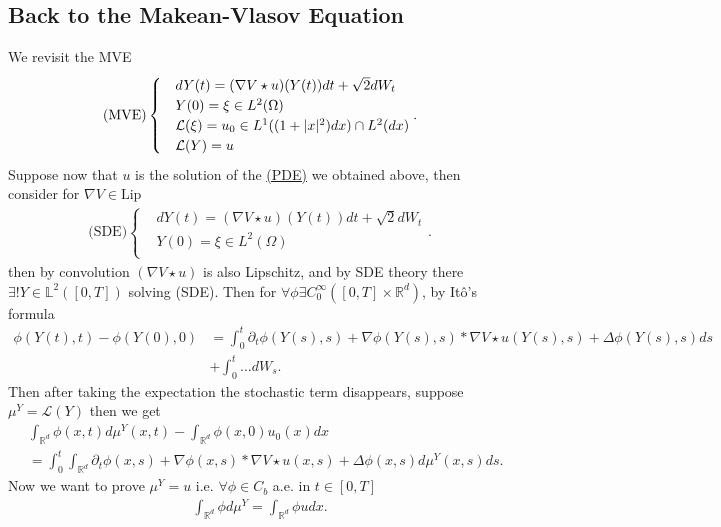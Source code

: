 \subsection{Back to the Makean-Vlasov Equation}
We revisit the MVE 
\begin{align*}
  \text{(MVE)}\begin{cases}
    &dY(t) = (\nabla V \star  u)(Y(t)) dt + \sqrt{2}dW_t \\
    &Y(0)  = \xi \in  L^{2}(\Omega )\\
    &\mathcal{L}(\xi) = u_0 \in  L^{1}((1+\lvert x\rvert^2)dx) \cap L^{2}(dx) \\
    &\mathcal{L}(Y) = u
  \end{cases}
.\end{align*}
Suppose now that $u$ is the solution of the  \hyperref[pde_mve_apprach]{(PDE)} we obtained above, then consider 
for $\nabla V \in  \text{Lip}$
\begin{align*} 
  \text{(SDE)}\begin{cases}
    &dY(t) = (\nabla V \star  u)(Y(t)) dt + \sqrt{2}dW_t \\
    &Y(0)  = \xi \in  L^{2}(\Omega )\\
  \end{cases}
.\end{align*}
then by convolution  $(\nabla V \star  u)$ is also Lipschitz, and by SDE theory there $\exists! Y \in  \mathbb{L}^2([0,T])$  solving (SDE).
Then for $\forall  \phi  \exists  C_0^{\infty}([0,T] \times  \mathbb{R}^{d} ) $, by It\^o's formula 
\begin{align*}
  \phi(Y(t),t) - \phi(Y(0),0) &= \int_0^{t}  \partial_t \phi(Y(s),s) + \nabla \phi(Y(s),s)* \nabla V \star u(Y(s),s) +\Delta \phi(Y(s),s) ds \\
                              &+ \int_0^{t}  \ldots  dW_s
.\end{align*}
Then after taking the expectation the stochastic term disappears, suppose $\mu ^{Y} = \mathcal{L}(Y) $ then we get 
\begin{align*}
  &\int_{\mathbb{R}^{d} } \phi(x,t) d\mu ^{Y}(x,t) - \int_{\mathbb{R}^{d} } \phi(x,0) u_0(x) dx \\
  &= \int_0^{t} \int_{\mathbb{R}^{d} } \partial_t \phi(x,s) + \nabla \phi(x,s) *\nabla V \star u(x,s) + \Delta  \phi(x,s) d\mu ^{Y}(x,s)ds 
.\end{align*}
Now we want to prove $\mu^Y = u$ i.e. $\forall  \phi  \in  C_b$ a.e. in  $t \in  [0,T]$
\begin{align*}
  \int_{\mathbb{R}^{d} }\phi  d\mu ^{Y} = \int_{\mathbb{R}^{d} }  \phi  u dx
.\end{align*}
